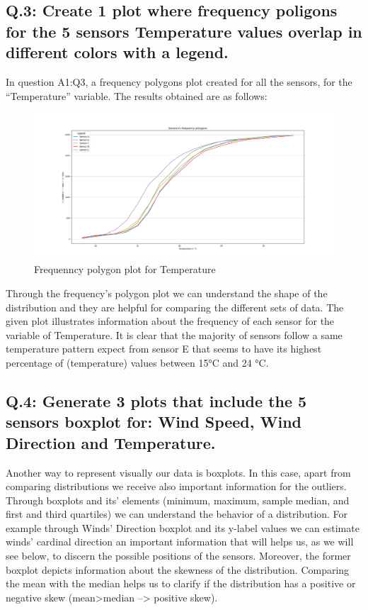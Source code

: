 \documentclass[a4paper]{article}
\begin{document}
    \subsection{Q.3: Create 1 plot where frequency poligons for the 5 sensors Temperature values overlap in different colors with a legend.}
    
        In question A1:Q3, a frequency polygons plot created for all the sensors, for the “Temperature” variable. The results obtained are as follows:
        
            \begin{figure}[H]
            \centering
                \includegraphics[width=\textwidth]{images/Frequency_polygons.png}
                \caption{Frequenncy polygon plot for Temperature}
                \label{fig:Frequency polygons}
            \end{figure}

        Through the frequency’s polygon plot we can understand the shape of the distribution and they are helpful for comparing the different sets of data. The given plot illustrates information about the frequency of each sensor for the variable of Temperature. It is clear that the majority of sensors follow a same temperature pattern expect from sensor E that seems to have its highest percentage of (temperature) values between 15°C and 24 °C. 

   
    \subsection{Q.4: Generate 3 plots that include the 5 sensors boxplot for: Wind Speed, Wind Direction and Temperature.}
     Another way to represent visually our data is boxplots. In this case, apart from comparing distributions we receive also important information for the outliers. Through boxplots and its’ elements (minimum, maximum, sample median, and first and third quartiles) we can understand the behavior of a distribution. For example through Winds’ Direction boxplot and its y-label values we can estimate winds’ cardinal direction an important information that will helps us, as we will see below, to discern the possible positions of the sensors. Moreover, the former boxplot depicts information about the skewness of the distribution. Comparing the mean with the median helps us to clarify if the distribution has a positive or negative skew (mean>median --> positive skew).
\end{document}
